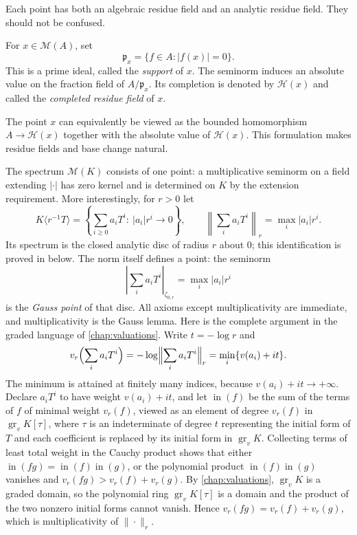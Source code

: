Each point has both an algebraic residue field and an analytic residue field.
They should not be confused.

\begin{definition}
\label{def:berk-support-residue-field}
For $x\in\mathcal M(A)$, set
\[
 \mathfrak p_x=\{f\in A:|f(x)|=0\}.
\]
This is a prime ideal, called the \emph{support} of $x$. The seminorm
induces an absolute value on the fraction field of $A/\mathfrak p_x$. Its
completion is denoted by $\mathcal H(x)$ and called the \emph{completed
residue field} of $x$.
\end{definition}

The point $x$ can equivalently be viewed as the bounded homomorphism
$A\to\mathcal H(x)$ together with the absolute value of
$\mathcal H(x)$. This formulation makes residue fields and base change
natural.

\begin{example}\label{ex:berk-tate-disc}
The spectrum $\mathcal M(K)$ consists of one point: a multiplicative
seminorm on a field extending $|\cdot|$ has zero kernel and is determined
on $K$ by the extension requirement. More interestingly,
for $r>0$ let
\[
 K\langle r^{-1}T\rangle
 =\left\{\sum_{i\geq0}a_iT^i:\ |a_i|r^i\longrightarrow0\right\},
 \qquad
 \left\|\sum_i a_iT^i\right\|_r=\max_i|a_i|r^i.
\]
Its spectrum is the closed analytic disc of radius $r$ about $0$; this
identification is proved in  below. The
norm itself defines a point: the seminorm
\[
             \left|\sum_i a_iT^i\right|_{\zeta_{0,r}}
             =\max_i |a_i|r^i
\]
is the \emph{Gauss point} of that disc.  All axioms
except multiplicativity are immediate, and multiplicativity is the Gauss
lemma.  Here is the complete argument in the graded language of
\cref{chap:valuations}.  Write $t=-\log r$ and
\[
 v_r\Bigl(\sum_i a_iT^i\Bigr)
 =-\log\Bigl\|\sum_i a_iT^i\Bigr\|_r
 =\min_i\{v(a_i)+it\}.
\]
The minimum is attained at finitely many indices, because
$v(a_i)+it\to+\infty$.  Declare $a_iT^i$ to have weight
$v(a_i)+it$, and let $\operatorname{in}(f)$ be the sum of the terms of
$f$ of minimal weight $v_r(f)$, viewed as an element of degree
$v_r(f)$ in $\operatorname{gr}_vK[\tau]$, where $\tau$ is an
indeterminate of degree $t$ representing the initial form of $T$ and
each coefficient is replaced by its initial form in
$\operatorname{gr}_vK$.  Collecting terms of least total weight in the
Cauchy product shows that either
$\operatorname{in}(fg)=\operatorname{in}(f)\operatorname{in}(g)$, or the
polynomial product $\operatorname{in}(f)\operatorname{in}(g)$ vanishes
and $v_r(fg)>v_r(f)+v_r(g)$.  By
\cref{chap:valuations}, $\operatorname{gr}_vK$ is a graded domain, so
the polynomial ring $\operatorname{gr}_vK[\tau]$ is a domain and the
product of the two nonzero initial forms cannot vanish.  Hence
$v_r(fg)=v_r(f)+v_r(g)$, which is multiplicativity of
$\|\cdot\|_r$.
\end{example}

